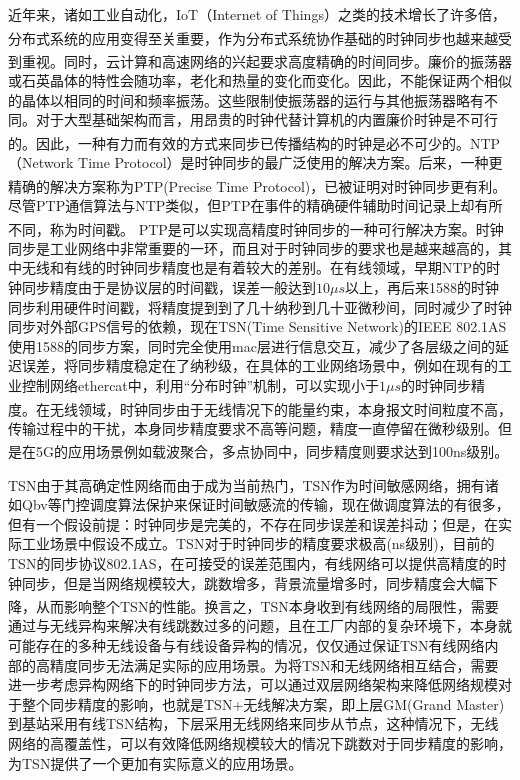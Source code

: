 \documentclass[UTF8,a4paper,12pt]{ctexart}
\numberwithin{equation}{section}
\begin{document}
近年来，诸如工业自动化，IoT（Internet of Things）之类的技术增长了许多倍，分布式系统的应用变得至关重要\textsuperscript{\cite{7879243}}，作为分布式系统协作基础的时钟同步也越来越受到重视。同时，云计算和高速网络的兴起要求高度精确的时间同步\textsuperscript{\cite{CHEN20143}}。廉价的振荡器或石英晶体的特性会随功率，老化和热量的变化而变化。因此，不能保证两个相似的晶体以相同的时间和频率振荡。这些限制使振荡器的运行与其他振荡器略有不同。对于大型基础架构而言，用昂贵的时钟代替计算机的内置廉价时钟是不可行的。因此，一种有力而有效的方式来同步已传播结构的时钟是必不可少的\textsuperscript{\cite{8278257}}。NTP（Network Time Protocol）是时钟同步的最广泛使用的解决方案。后来，一种更精确的解决方案称为PTP(Precise Time Protocol)，已被证明对时钟同步更有利\textsuperscript{\cite{5223605}}。尽管PTP通信算法与NTP类似，但PTP在事件的精确硬件辅助时间记录上却有所不同，称为时间戳\textsuperscript{\cite{ahmed2018survey}}。 PTP是可以实现高精度时钟同步的一种可行解决方案。时钟同步是工业网络中非常重要的一环，而且对于时钟同步的要求也是越来越高的，其中无线和有线的时钟同步精度也是有着较大的差别。在有线领域，早期NTP的时钟同步精度由于是协议层的时间戳，误差一般达到$10\mu s$以上，再后来1588的时钟同步利用硬件时间戳，将精度提到到了几十纳秒到几十亚微秒间，同时减少了时钟同步对外部GPS信号的依赖，现在TSN(Time Sensitive Network)的IEEE 802.1AS使用1588的同步方案，同时完全使用mac层进行信息交互，减少了各层级之间的延迟误差，将同步精度稳定在了纳秒级，在具体的工业网络场景中，例如在现有的工业控制网络ethercat中，利用“分布时钟”机制，可以实现小于$1 \mu s$的时钟同步精度\textsuperscript{\cite{idrees2020ieee}}。在无线领域，时钟同步由于无线情况下的能量约束，本身报文时间粒度不高，传输过程中的干扰，本身同步精度要求不高等问题，精度一直停留在微秒级别。但是在5G的应用场景例如载波聚合，多点协同中，同步精度则要求达到100ns级别\textsuperscript{\cite{jakovetic2014fast}}。


TSN由于其高确定性网络而由于成为当前热门，TSN作为时间敏感网络，拥有诸如Qbv等门控调度算法保护来保证时间敏感流的传输，现在做调度算法的有很多，但有一个假设前提：时钟同步是完美的，不存在同步误差和误差抖动；但是，在实际工业场景中假设不成立。TSN对于时钟同步的精度要求极高(ns级别)，目前的TSN的同步协议802.1AS，在可接受的误差范围内，有线网络可以提供高精度的时钟同步，但是当网络规模较大，跳数增多，背景流量增多时，同步精度会大幅下降，从而影响整个TSN的性能。\textsuperscript{\cite{ieee2011ieee}}换言之，TSN本身收到有线网络的局限性，需要通过与无线异构来解决有线跳数过多的问题，且在工厂内部的复杂环境下，本身就可能存在的多种无线设备与有线设备异构的情况，仅仅通过保证TSN有线网络内部的高精度同步无法满足实际的应用场景。为将TSN和无线网络相互结合，需要进一步考虑异构网络下的时钟同步方法，可以通过双层网络架构来降低网络规模对于整个同步精度的影响，也就是TSN+无线解决方案，即上层GM(Grand Master)到基站采用有线TSN结构，下层采用无线网络来同步从节点，这种情况下，无线网络的高覆盖性，可以有效降低网络规模较大的情况下跳数对于同步精度的影响，为TSN提供了一个更加有实际意义的应用场景。
\end{document}
